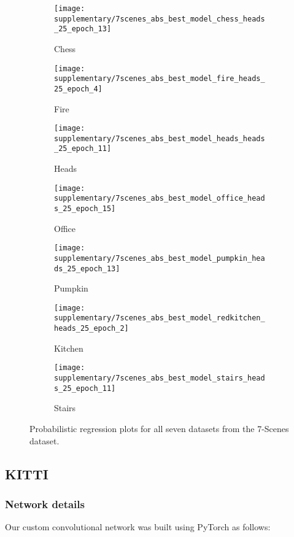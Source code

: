 \begin{figure*}[h!]
	\centering
	\begin{subfigure}[]{0.33\textwidth}
		\texttt{[image: supplementary/7scenes\_abs\_best\_model\_chess\_heads\_25\_epoch\_13]}
		\caption{Chess}
	\end{subfigure}
	\begin{subfigure}[]{0.33\textwidth} 
		\texttt{[image: supplementary/7scenes\_abs\_best\_model\_fire\_heads\_25\_epoch\_4]}
		\caption{Fire}
	\end{subfigure}
	\begin{subfigure}[]{0.33\textwidth} 
		\texttt{[image: supplementary/7scenes\_abs\_best\_model\_heads\_heads\_25\_epoch\_11]}
		\caption{Heads}
	\end{subfigure}
	\begin{subfigure}[]{0.33\textwidth} 
		\texttt{[image: supplementary/7scenes\_abs\_best\_model\_office\_heads\_25\_epoch\_15]}
		\caption{Office}
	\end{subfigure}
	\begin{subfigure}[]{0.33\textwidth} 
		\texttt{[image: supplementary/7scenes\_abs\_best\_model\_pumpkin\_heads\_25\_epoch\_13]}
		\caption{Pumpkin}
	\end{subfigure}
	\begin{subfigure}[]{0.33\textwidth} 
		\texttt{[image: supplementary/7scenes\_abs\_best\_model\_redkitchen\_heads\_25\_epoch\_2]}
		\caption{Kitchen}
	\end{subfigure}
	\begin{subfigure}[]{0.33\textwidth} 
		\texttt{[image: supplementary/7scenes\_abs\_best\_model\_stairs\_heads\_25\_epoch\_11]}
		\caption{Stairs}
	\end{subfigure}
	
	\caption{Probabilistic regression plots for all seven datasets from the 7-Scenes dataset.}
	\label{fig:7scenes_regression}
\end{figure*}

\subsection{KITTI}
\subsubsection{Network details}
Our custom convolutional network was built using PyTorch as follows:

